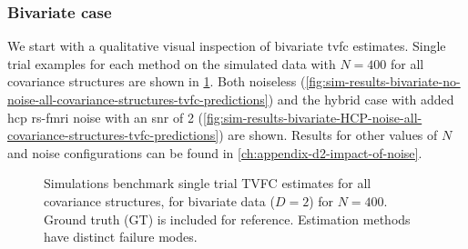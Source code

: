 \subsubsection{Bivariate case}

We start with a qualitative visual inspection of bivariate \gls{tvfc} estimates.
Single trial examples for each method on the simulated data with $N = 400$ for all covariance structures are shown in \cref{fig:sim-results-tvfc-estimates-example}.
Both noiseless (\cref{fig:sim-results-bivariate-no-noise-all-covariance-structures-tvfc-predictions}) and the hybrid case with added \gls{hcp} \gls{rs-fmri} noise with an \gls{snr} of 2 (\cref{fig:sim-results-bivariate-HCP-noise-all-covariance-structures-tvfc-predictions}) are shown.
Results for other values of $N$ and noise configurations can be found in \cref{ch:appendix-d2-impact-of-noise}.


\begin{figure}[t]
  \centering
  \caption{
    Simulations benchmark single trial TVFC estimates for all covariance structures, for bivariate data ($D = 2$) for $N = 400$.
    Ground truth (GT) is included for reference.
    Estimation methods have distinct failure modes.
  }\label{fig:sim-results-tvfc-estimates-example}
\end{figure}


